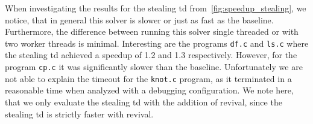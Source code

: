   When investigating the results for the stealing \ac{td} from~\autoref{fig:speedup_stealing}, we notice, that in general this solver is slower or just as fast as the baseline. Furthermore, the difference between running this solver single threaded or with two worker threads is minimal. Interesting are the programs \texttt{df.c} and \texttt{ls.c} where the stealing \ac{td} achieved a speedup of 1.2 and 1.3 respectively. However, for the program \texttt{cp.c} it was significantly slower than the baseline. Unfortunately we are not able to explain the timeout for the \texttt{knot.c} program, as it terminated in a reasonable time when analyzed with a debugging configuration. We note here, that we only evaluate the stealing \ac{td} with the addition of revival, since the stealing \ac{td} is strictly faster with revival.

